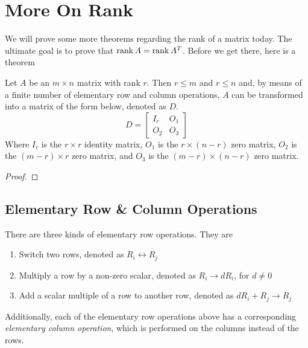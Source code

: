 \documentclass[main.tex]{subfiles}
\begin{document}
    \chapter{More On Rank}

    We will prove some more theorems regarding the rank of a matrix today. The ultimate goal is to prove that $\operatorname{rank} A = \operatorname{rank} A^T$. Before we get there, here is a theorem
    \begin{thrm}{}{}
        Let $A$ be an $m\times n$ matrix with rank $r$. Then $r \leq m$ and $r \leq n$ and, by means of a finite number of elementary row and column operations, $A$ can be transformed into a matrix of the form below, denoted as $D$. 
        \begin{equation*}
            D = \begin{bmatrix}
                I_r & O_1 \\
                O_2 & O_3
            \end{bmatrix}
        \end{equation*}
        Where $I_r$ is the $r\times r$ identity matrix, $O_1$ is the $r\times (n-r)$ zero matrix, $O_2$ is the $(m-r)\times r$ zero matrix, and $O_3$ is the $(m-r)\times (n-r)$ zero matrix.
    \end{thrm}
    \begin{proof}

    \end{proof}

    \section{Elementary Row \& Column Operations}
    There are three kinds of elementary row operations. They are 
    \begin{enumerate}
        \item Switch two rows, denoted as $R_i \longleftrightarrow R_j$
        \item Multiply a row by a non-zero scalar, denoted as $R_i \to dR_i$, for $d\neq 0$
        \item Add a scalar multiple of a row to another row, denoted as $dR_i + R_j \to R_j$
    \end{enumerate}
    Additionally, each of the elementary row operations above has a corresponding \emph{elementary column operation}, which is performed on the columns instead of the rows. \par 
\end{document}
